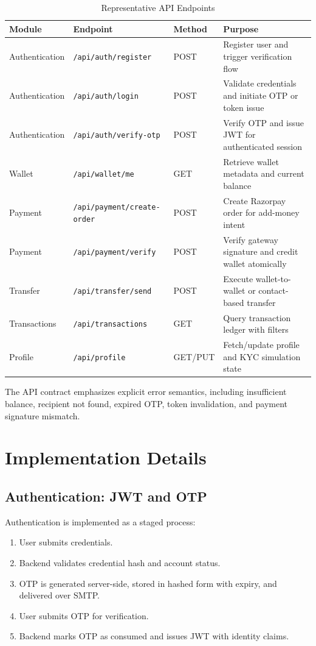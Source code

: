 \documentclass[conference]{IEEEtran}
\begin{document}
\begin{table}[t]
\caption{Representative API Endpoints}
\label{tab:api_endpoints}
\centering
\small
\begin{tabular}{p{2.2cm}p{3.5cm}p{2.3cm}p{7.0cm}}
\toprule
\textbf{Module} & \textbf{Endpoint} & \textbf{Method} & \textbf{Purpose} \\
\midrule
Authentication & \texttt{/api/auth/register} & POST & Register user and trigger verification flow \\
Authentication & \texttt{/api/auth/login} & POST & Validate credentials and initiate OTP or token issue \\
Authentication & \texttt{/api/auth/verify-otp} & POST & Verify OTP and issue JWT for authenticated session \\
Wallet & \texttt{/api/wallet/me} & GET & Retrieve wallet metadata and current balance \\
Payment & \texttt{/api/payment/create-order} & POST & Create Razorpay order for add-money intent \\
Payment & \texttt{/api/payment/verify} & POST & Verify gateway signature and credit wallet atomically \\
Transfer & \texttt{/api/transfer/send} & POST & Execute wallet-to-wallet or contact-based transfer \\
Transactions & \texttt{/api/transactions} & GET & Query transaction ledger with filters \\
Profile & \texttt{/api/profile} & GET/PUT & Fetch/update profile and KYC simulation state \\
\bottomrule
\end{tabular}
\end{table}

The API contract emphasizes explicit error semantics, including insufficient balance, recipient not found, expired OTP, token invalidation, and payment signature mismatch.

\section{Implementation Details}
\subsection{Authentication: JWT and OTP}
Authentication is implemented as a staged process:
\begin{enumerate}
\item User submits credentials.
\item Backend validates credential hash and account status.
\item OTP is generated server-side, stored in hashed form with expiry, and delivered over SMTP.
\item User submits OTP for verification.
\item Backend marks OTP as consumed and issues JWT with identity claims.
\end{enumerate}
\end{document}
